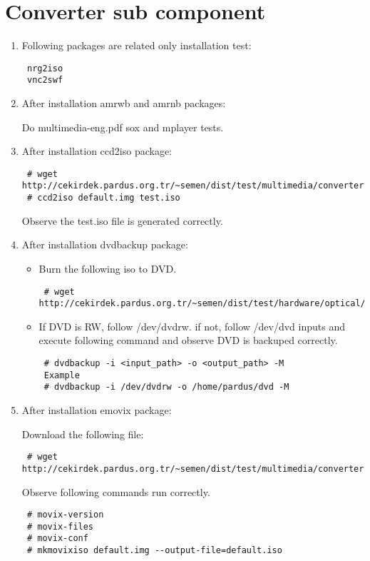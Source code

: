 \documentclass[a4paper,10pt]{article}
\begin{document}
\section{Converter sub component}
\begin{enumerate}
 \item Following packages are related only installation test:
\begin{verbatim}
 nrg2iso
 vnc2swf
\end{verbatim}

 \item After installation amrwb and amrnb packages:

 Do multimedia-eng.pdf sox and mplayer tests.

\item After installation ccd2iso package:
\begin{verbatim}
 # wget http://cekirdek.pardus.org.tr/~semen/dist/test/multimedia/converter/default.img
 # ccd2iso default.img test.iso
\end{verbatim}

Observe the test.iso file is generated correctly.

\item After installation dvdbackup package:
\begin{itemize}
 \item Burn the following iso to DVD. 
\begin{verbatim}
 # wget http://cekirdek.pardus.org.tr/~semen/dist/test/hardware/optical/boot.iso
\end{verbatim}
 \item If DVD is RW, follow /dev/dvdrw. if not, follow /dev/dvd inputs and execute following command and observe DVD is backuped correctly.
\begin{verbatim}
 # dvdbackup -i <input_path> -o <output_path> -M
 Example 
 # dvdbackup -i /dev/dvdrw -o /home/pardus/dvd -M
\end{verbatim}
 
\end{itemize}
\item After installation emovix package:

Download the following file:
\begin{verbatim}
 # wget http://cekirdek.pardus.org.tr/~semen/dist/test/multimedia/converter/default.img
\end{verbatim}
 
Observe following commands run correctly.
\begin{verbatim}
 # movix-version
 # movix-files
 # movix-conf
 # mkmovixiso default.img --output-file=default.iso
\end{verbatim}


\end{enumerate}
\end{document}
